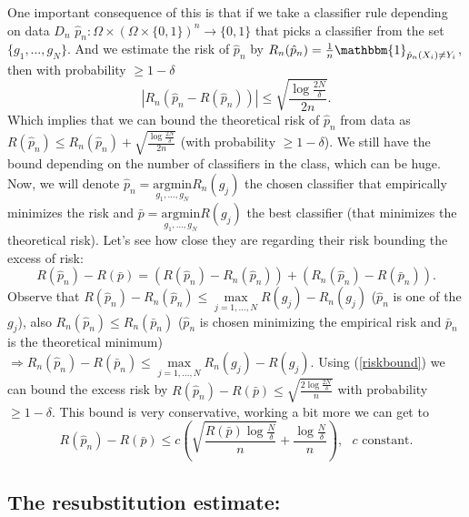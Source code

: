 \documentclass[11pt, english]{article}
\begin{document}
One important consequence of this is that if we take a classifier rule depending on data $D_n$ $\hat{p}_n:\Omega\times(\Omega\times\{0,1\})^n\rightarrow \{0,1\}$ that picks a classifier from the set $\{g_1,\dots,g_N\}$. And we estimate the risk of $\hat{p}_n$ by $R_n(\hat{p}_n)= \frac{1}{n}\mathbbm{1}_{\hat{p}_n(X_i)\neq Y_i}$, then with probability $\geq 1-\delta$
\begin{equation}
	|R_n(\hat{p}_n-R(\hat{p}_n))|\leq \sqrt{\frac{\log\frac{2N}{\delta}}{2n}}.
	\label{riskbound}
\end{equation}
Which implies that we can bound the theoretical risk of $\hat{p}_n$ from data as $R(\hat{p}_n)\leq R_n(\hat{p}_n)+ \sqrt{\frac{\log\frac{2N}{\delta}}{2n}}$ (with probability $\geq 1-\delta$). We still have the bound depending on the number of classifiers in the class, which can be huge.\\

Now, we will denote $\hat{p}_n=\underset{g_1,\dots,g_N}{\text{argmin}}R_n(g_j)$ the chosen classifier that empirically minimizes the risk and $\bar{p}=\underset{g_1,\dots,g_N}{\text{argmin}}R(g_j)$ the best classifier (that minimizes the theoretical risk). Let's see how close they are regarding their risk bounding the excess of risk:
\begin{equation}
	R(\hat{p}_n)-R(\bar{p})=(R(\hat{p}_n)-R_n(\hat{p}_n))+(R_n(\hat{p}_n)-R(\bar{p}_n)).
\end{equation}
Observe that $R(\hat{p}_n)-R_n(\hat{p}_n)\leq\underset{j=1,\dots,N}{\max}R(g_j)-R_n(g_j)$ ($\hat{p}_n$ is one of the $g_j$), also $R_n(\hat{p}_n)\leq R_n(\bar{p}_n)$ ($\hat{p}_n$ is chosen minimizing the empirical risk and $\bar{p}_n$ is the theoretical minimum) $\Rightarrow R_n(\hat{p}_n)-R(\bar{p}_n)\leq \underset{j=1,\dots,N}{\max}R_n(g_j)-R(g_j)$. Using (\ref{riskbound}) we can bound the excess risk by $R(\hat{p}_n)-R(\bar{p})\leq \sqrt{\frac{2\log\frac{2N}{\delta}}{n}}$ with probability $\geq 1-\delta$. This bound is very conservative, working a bit more we can get to
\begin{equation}
	R(\hat{p}_n)-R(\bar{p})\leq c\left(\sqrt{\frac{R(\bar{p})\log\frac{N}{\delta}}{n}}+\frac{\log\frac{N}{\delta}}{n}\right), \text{ }c \text{ constant}.
\end{equation}
\subsection{The resubstitution estimate:}
\end{document}
